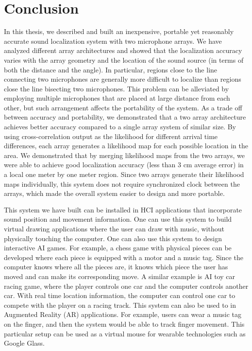 \chapter{Conclusion}
In this thesis, we described and built an inexpensive, portable yet reasonably accurate sound localization system with two microphone arrays. We have analyzed different array architectures and showed that the localization accuracy varies with the array geometry and the location of the sound source (in terms of both the distance and the angle). In particular, regions close to the line connecting two microphones are generally more difficult to localize than regions close the line bisecting two microphones. This problem can be alleviated by employing multiple microphones that are placed at large distance from each other, but such arrangement affects the portability of the system. As a trade off between accuracy and portability, we demonstrated that a two array architecture achieves better accuracy compared to a single array system of similar size. By using cross-correlation output as the likelihood for different arrival time differences, each array generates a likelihood map for each possible location in the area. We demonstrated that by merging likelihood maps from the two arrays, we were able to achieve good localization accuracy (less than $3$ cm average error) in a local one meter by one meter region. Since two arrays generate their likelihood maps individually, this system does not require synchronized clock between the arrays, which made the overall system easier to design and more portable.

This system we have built can be installed in HCI applications that incorporate sound position and movement information. One can use this system to build virtual drawing applications where the user can draw with music, without physically touching the computer. One can also use this system to design interactive AI games. For example, a chess game with physical pieces can be developed where each piece is equipped with a motor and a music tag. Since the computer knows where all the pieces are, it knows which piece the user has moved and can make its corresponding move. A similar example is AI toy car racing game, where the player controls one car and the computer controls another car. With real time location information, the computer can control one car to compete with the player on a racing track. This system can also be used to in Augmented Reality (AR) applications. For example, users can wear a music tag on the finger, and then the system would be able to track finger movement. This particular setup can be used as a virtual mouse for wearable technologies such as Google Glass. 

